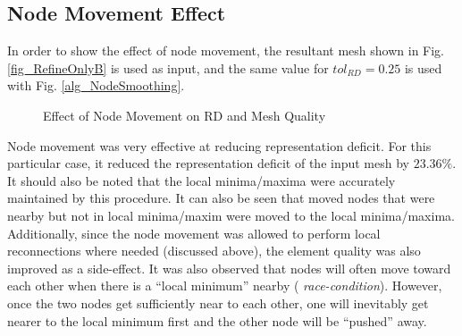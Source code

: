 \subsection{Node Movement Effect}
In order to show the effect of node movement, the resultant mesh shown
in Fig. \ref{fig_RefineOnlyB} is used as input, and the same value for
$tol_{RD} = 0.25$ is used with Fig. \ref{alg_NodeSmoothing}.

\begin{figure}[h!]
  \begin{center}
 
  \caption{Effect of Node Movement on RD and Mesh Quality}
  \label{fig_NodeSmoothing}

  \end{center}
\end{figure}

Node movement was very effective at reducing representation deficit.
For this particular case, it reduced the representation deficit of the
input mesh by $23.36\%$. It should also be noted that the local
minima/maxima were accurately maintained by this procedure. It can also
be seen that moved nodes that were nearby but not in local minima/maxim
were moved to the local minima/maxima.  Additionally, since the node
movement was allowed to perform local reconnections where needed
(discussed above), the element quality was also improved as a
side-effect.  It was also observed that nodes will often move toward
each other when there is a ``local minimum'' nearby ({\it
race-condition}).  However, once the two nodes get sufficiently near to
each other, one will inevitably get nearer to the local minimum first
and the other node will be ``pushed'' away.

